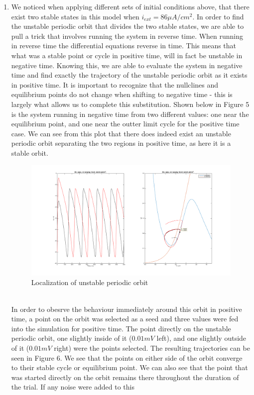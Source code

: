\documentclass[10pt]{report}
\begin{document}
\begin{enumerate}
%
%
\item We noticed when applying different sets of initial conditions above, that there exist two stable states in this model when $i_{ext} = 86 \mu A/cm^2$. In order to find the unstable periodic orbit that divides the two stable states, we are able to pull a trick that involves running the system in reverse time. When running in reverse time the differential equations reverse in time. This means that what was a stable point or cycle in positive time, will in fact be unstable in negative time. Knowing this, we are able to evaluate the system in negative time and find exactly the trajectory of the unstable periodic orbit as it exists in positive time. It is important to recognize that the nullclines and equilibrium points do not change when shifting to negative time - this is largely what allows us to complete this substitution. Shown below in Figure 5 is the system running in negative time from two different values: one near the equilibrium point, and one near the outter limit cycle for the positive time case. We can see from this plot that there does indeed exist an unstable periodic orbit separating the two regions in positive time, as here it is a stable orbit. \begin{figure}[h!] \includegraphics[scale=0.25]{motnq91.png} \caption[h5]{Localization of unstable periodic orbit} \end{figure} \\ In order to obesrve the behaviour immediately around this orbit in positive time, a point on the orbit was selected as a seed and three values were fed into the simulation for positive time. The point directly on the unstable periodic orbit, one slightly inside  of it ($0.01 mV$ left), and one slightly outside of it ($0.01 mV$ right) were the points selected. The resulting trajectories can be seen in Figure 6. We see that the points on either side of the orbit converge to their stable cycle or equilibrium point. We can also see that the point that was started directly on the orbit remains there throughout the duration of the trial. If any noise were added to this 
\end{enumerate}
\end{document}
